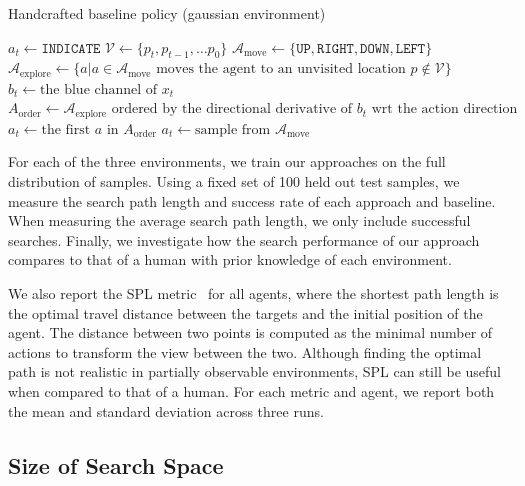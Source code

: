 \begin{algorithm}
    \caption{Handcrafted baseline policy (gaussian environment)}
    \label{alg:handcrafted}
    \begin{algorithmic}
            \State \(a_t \leftarrow \mathtt{INDICATE}\)
        \Else
            \State \(\mathcal{V} \leftarrow \{p_t, p_{t-1}, \dots p_0\}\)
            \State \(\mathcal{A}_{\text{move}} \leftarrow \{\mathtt{UP}, \mathtt{RIGHT}, \mathtt{DOWN}, \mathtt{LEFT}\}\)
            \State \(\mathcal{A}_{\text{explore}} \leftarrow \{a | a \in \mathcal{A}_{\text{move}} \text{ moves the agent to an unvisited location } p \notin \mathcal{V}\}\) 
                \State \(b_t \leftarrow \text{the blue channel of } x_t\)
                \State \(A_{\text{order}} \leftarrow \mathcal{A}_{\text{explore}} \text{ ordered by the directional derivative of } b_t \text{ wrt the action direction}\)
                \State \(a_t \leftarrow \text{the first } a \text{ in } A_{\text{order}}\)
            \Else
                \State \(a_t \leftarrow \text{sample from } \mathcal{A}_{\text{move}}\)
            \EndIf
        \EndIf
    \end{algorithmic}
\end{algorithm}


For each of the three environments, we train our approaches on the full distribution of samples.
Using a fixed set of 100 held out test samples, we measure the search path length and success rate of each approach and baseline.
When measuring the average search path length, we only include successful searches.
Finally, we investigate how the search performance of our approach compares to that of a human with prior knowledge of each environment.

We also report the SPL metric~\cite{anderson_evaluation_2018} for all agents, where the shortest path length is the optimal travel distance between the targets and the initial position of the agent.
The distance between two points is computed as the minimal number of actions to transform the view between the two.
Although finding the optimal path is not realistic in partially observable environments, SPL can still be useful when compared to that of a human.
For each metric and agent, we report both the mean and standard deviation across three runs.

\subsection{Size of Search Space}

